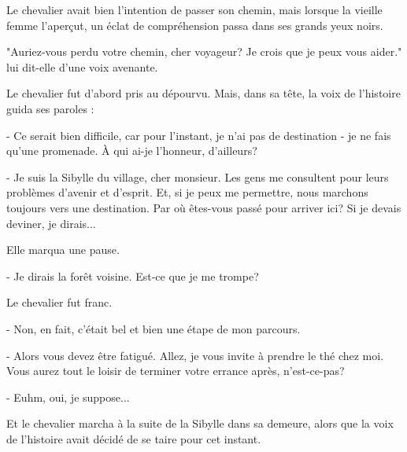 \documentclass[a4paper,11pt, openany]{book}
\begin{document}
Le chevalier avait bien l'intention de passer son chemin, mais lorsque la vieille femme l'aperçut, un éclat de compréhension passa dans ses grands yeux noirs.

"Auriez-vous perdu votre chemin, cher voyageur? Je crois que je peux vous aider." lui dit-elle d'une voix avenante.

Le chevalier fut d'abord pris au dépourvu. Mais, dans sa tête, la voix de l'histoire guida ses paroles : 

- Ce serait bien difficile, car pour l'instant, je n'ai pas de destination - je ne fais qu'une promenade. À qui ai-je l'honneur, d'ailleurs?

- Je suis la Sibylle du village, cher monsieur. Les gens me consultent pour leurs problèmes d'avenir et d'esprit. 
Et, si je peux me permettre, nous marchons toujours vers une destination. Par où êtes-vous passé pour arriver ici? Si je devais deviner, je dirais...

Elle marqua une pause.

- Je dirais la forêt voisine. Est-ce que je me trompe?

Le chevalier fut franc.

- Non, en fait, c'était bel et bien une étape de mon parcours.

- Alors vous devez être fatigué. Allez, je vous invite à prendre le thé chez moi. Vous aurez tout le loisir de terminer votre errance après, n'est-ce-pas?

- Euhm, oui, je suppose...

Et le chevalier marcha à la suite de la Sibylle dans sa demeure, alors que la voix de l'histoire avait décidé de se taire pour cet instant.
\end{document}

